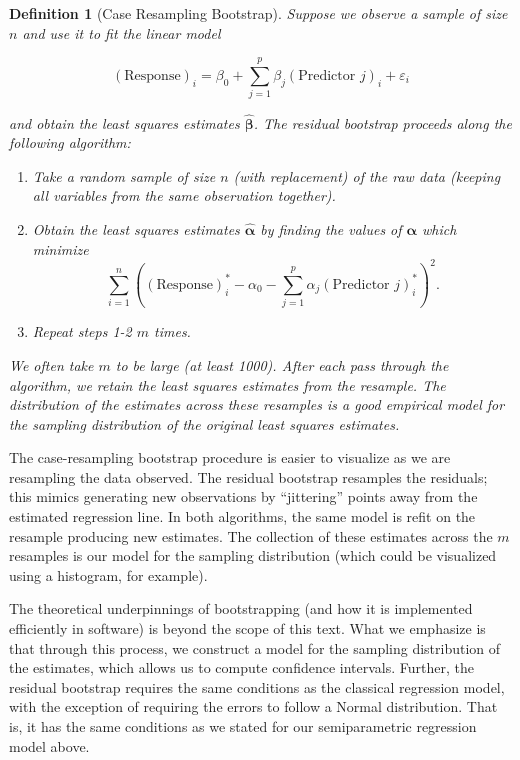 \documentclass[
]{book}
\providecommand{\tightlist}{%
  \setlength{\itemsep}{0pt}\setlength{\parskip}{0pt}}
\theoremstyle{plain}
\theoremstyle{mydefn}
\newtheorem{definition}{Definition}[chapter]
\theoremstyle{myexmpl}
\theoremstyle{remark}
\begin{document}
\begin{definition}[Case Resampling Bootstrap]
Suppose we observe a sample of size \(n\) and use it to fit the linear model

\[(\text{Response})_i = \beta_0 + \sum_{j=1}^{p} \beta_j (\text{Predictor } j)_i + \varepsilon_i\]

and obtain the least squares estimates \(\widehat{\boldsymbol{\beta}}\). The residual bootstrap proceeds along the following algorithm:

\begin{enumerate}
\def\labelenumi{\arabic{enumi}.}
\tightlist
\item
  Take a random sample of size \(n\) (with replacement) of the raw data (keeping all variables from the same observation together).
\item
  Obtain the least squares estimates \(\widehat{\boldsymbol{\alpha}}\) by finding the values of \(\boldsymbol{\alpha}\) which minimize
  \[\sum_{i=1}^{n} \left((\text{Response})_i^* - \alpha_0 - \sum_{j=1}^{p} \alpha_j (\text{Predictor } j)_i^*\right)^2.\]
\item
  Repeat steps 1-2 \(m\) times.
\end{enumerate}

We often take \(m\) to be large (at least 1000). After each pass through the algorithm, we retain the least squares estimates from the resample. The distribution of the estimates across these resamples is a good empirical model for the sampling distribution of the original least squares estimates.
\end{definition}

The case-resampling bootstrap procedure is easier to visualize as we are resampling the data observed. The residual bootstrap resamples the residuals; this mimics generating new observations by ``jittering'' points away from the estimated regression line. In both algorithms, the same model is refit on the resample producing new estimates. The collection of these estimates across the \(m\) resamples is our model for the sampling distribution (which could be visualized using a histogram, for example).

The theoretical underpinnings of bootstrapping (and how it is implemented efficiently in software) is beyond the scope of this text. What we emphasize is that through this process, we construct a model for the sampling distribution of the estimates, which allows us to compute confidence intervals. Further, the residual bootstrap requires the same conditions as the classical regression model, with the exception of requiring the errors to follow a Normal distribution. That is, it has the same conditions as we stated for our semiparametric regression model above.
\end{document}
